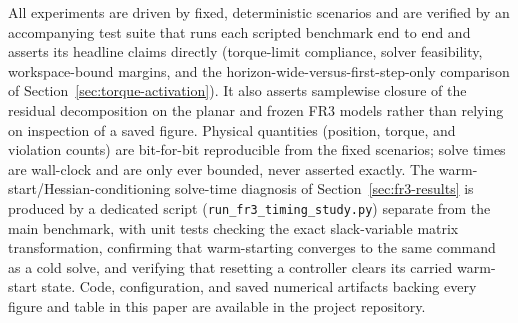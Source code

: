 \documentclass[journal]{IEEEtran}
\begin{document}
All experiments are driven by fixed, deterministic scenarios and are
verified by an accompanying test suite that runs each scripted benchmark
end to end and asserts its headline claims directly (torque-limit
compliance, solver feasibility, workspace-bound margins, and the
horizon-wide-versus-first-step-only comparison of
Section~\ref{sec:torque-activation}). It also asserts samplewise closure
of the residual decomposition on the planar and frozen FR3 models rather
than relying on inspection
of a saved figure. Physical quantities (position, torque, and violation
counts) are bit-for-bit reproducible from the fixed scenarios; solve
times are wall-clock and are only ever bounded, never asserted exactly.
The warm-start/Hessian-conditioning solve-time diagnosis of
Section~\ref{sec:fr3-results} is produced by a dedicated script
(\texttt{run\_fr3\_timing\_study.py}) separate from the main benchmark,
with unit tests checking the exact slack-variable matrix transformation,
confirming that warm-starting converges to the same command as a cold solve,
and verifying that resetting a controller clears its carried warm-start
state. Code, configuration, and saved numerical
artifacts backing every figure and table in this paper are available in
the project repository.
\end{document}
